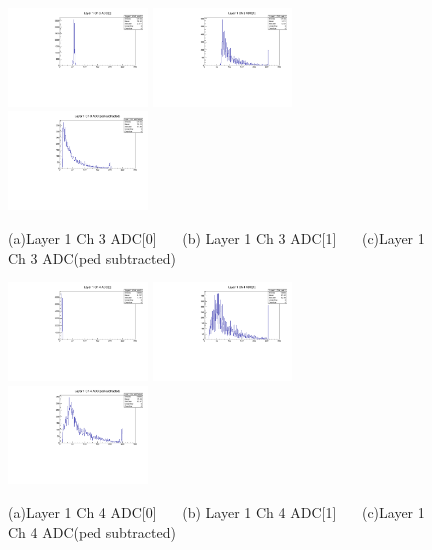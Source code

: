 \documentclass[a4paper,11pt]{article}
\theoremstyle{mytheor}
\begin{document}
\begin{figure}[H] 
\vspace*{-0.3cm} 
\includegraphics[width=0.33\textwidth,scale=0.5,trim=0 0 0 0,clip]{plotsdir/file0_muons-Layer1_Ch3_adc0-1.pdf} 
\includegraphics[width=0.33\textwidth,scale=0.5,trim=0 0 0 0,clip]{plotsdir/file0_muons-Layer1_Ch3_adc1-1.pdf} 
\includegraphics[width=0.33\textwidth,scale=0.5,trim=0 0 0 0,clip]{plotsdir/file0_muons-Layer1_Ch3_adcPedsub-1.pdf} 
\caption{(a)Layer 1 Ch 3 ADC[0] ~~~(b) Layer 1 Ch 3 ADC[1] ~~~(c)Layer 1 Ch 3 ADC(ped subtracted) } 
\end{figure} 
\begin{figure}[H] 
\vspace*{-0.3cm} 
\includegraphics[width=0.33\textwidth,scale=0.5,trim=0 0 0 0,clip]{plotsdir/file0_muons-Layer1_Ch4_adc0-1.pdf} 
\includegraphics[width=0.33\textwidth,scale=0.5,trim=0 0 0 0,clip]{plotsdir/file0_muons-Layer1_Ch4_adc1-1.pdf} 
\includegraphics[width=0.33\textwidth,scale=0.5,trim=0 0 0 0,clip]{plotsdir/file0_muons-Layer1_Ch4_adcPedsub-1.pdf} 
\caption{(a)Layer 1 Ch 4 ADC[0] ~~~(b) Layer 1 Ch 4 ADC[1] ~~~(c)Layer 1 Ch 4 ADC(ped subtracted) } 
\end{figure} 
\end{document}
